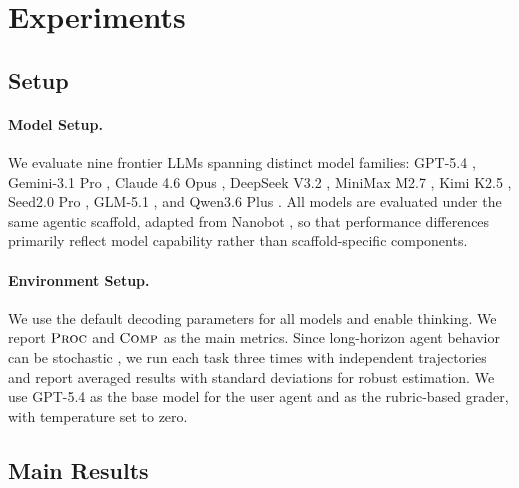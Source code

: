 \documentclass{llmxive}
\begin{document}
\section{Experiments}
\label{sec:exp}

\subsection{Setup}
\label{sec:exp_setup}

\paragraph{Model Setup.}
We evaluate nine frontier LLMs spanning distinct model families: GPT-5.4 \citep{gpt54}, Gemini-3.1 Pro \citep{gemini31pro}, Claude 4.6 Opus \citep{claudeopus46}, DeepSeek V3.2 \citep{liu2025deepseek}, MiniMax M2.7 \citep{minimax2026m27}, Kimi K2.5 \citep{team2026kimi}, Seed2.0 Pro \citep{seed20pro}, GLM-5.1 \citep{zai2026glm51}, and Qwen3.6 Plus \citep{qwen36plus}. 
All models are evaluated under the same agentic scaffold, adapted from Nanobot \citep{nanobot}, so that performance differences primarily reflect model capability rather than scaffold-specific components.

\paragraph{Environment Setup.}
We use the default decoding parameters for all models and enable thinking. We report $\textsc{Proc}$ and $\textsc{Comp}$ as the main metrics. Since long-horizon agent behavior can be stochastic \citep{mustahsan2025stochasticity}, we run each task three times with independent trajectories and report averaged results with standard deviations for robust estimation. We use GPT-5.4 as the base model for the user agent and as the rubric-based grader, with temperature set to zero.

\subsection{Main Results}
\label{sec:exp_main}
\end{document}
